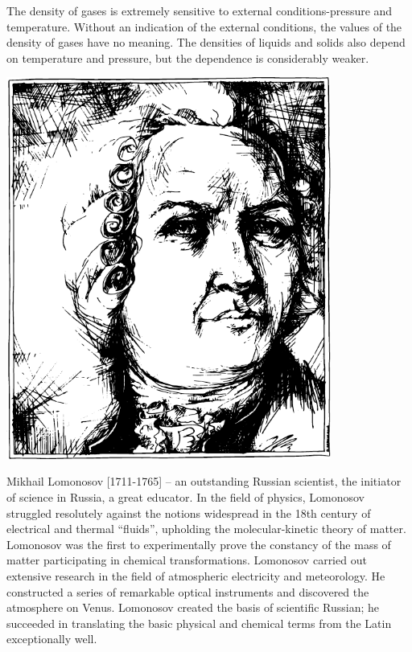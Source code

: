 The density of gases is extremely sensitive to external
conditions-pressure and temperature. Without an indication of the
external conditions, the values of the density of gases have no
meaning. The densities of liquids and solids also depend on
temperature and pressure, but the dependence is considerably weaker.





\begin{center}
\includegraphics[width=0.8\textwidth]{figures/lomonosov.pdf}
\end{center}
{\small \textsf{{Mikhail Lomonosov [1711-1765]}} -- \textsf{\footnotesize an outstanding Russian scientist, the initiator of science in Russia, a great educator. In the field of physics, Lomonosov struggled resolutely against the notions widespread in the 18th century of electrical and thermal ``fluids'', upholding the molecular-kinetic theory of matter. Lomonosov was the first to experimentally prove the constancy of the mass of matter participating in chemical transformations. Lomonosov carried out extensive research in the field of atmospheric electricity and meteorology. He constructed a series of remarkable optical instruments and discovered the atmosphere on Venus. Lomonosov created the basis of scientific Russian; he succeeded in translating the basic physical and chemical terms from the Latin exceptionally well.}}


